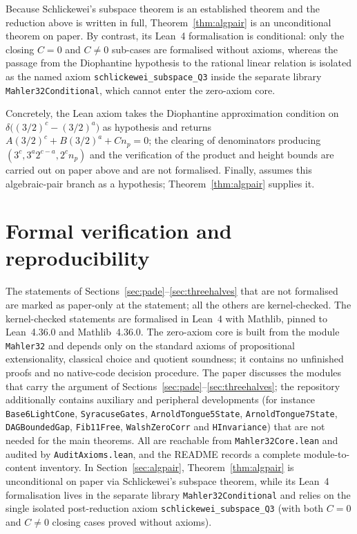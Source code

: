 \documentclass[11pt,a4paper]{article}
\theoremstyle{remark}
\begin{document}
Because Schlickewei's subspace theorem is an established theorem and the reduction above is written in full, Theorem~\ref{thm:algpair} is an unconditional theorem on paper. By contrast, its Lean~4 formalisation is conditional: only the closing $C = 0$ and $C \neq 0$ sub-cases are formalised without axioms, whereas the passage from the Diophantine hypothesis to the rational linear relation is isolated as the named axiom \texttt{schlickewei\_subspace\_Q3} inside the separate library \texttt{Mahler32Conditional}, which cannot enter the zero-axiom core.

Concretely, the Lean axiom takes the Diophantine approximation condition on $\delta\bigl((3/2)^{c}-(3/2)^{a}\bigr)$ as hypothesis and returns $A(3/2)^{c} + B(3/2)^{a} + C n_{p} = 0$; the clearing of denominators producing $(3^{c}, 3^{a}2^{c-a}, 2^{c}n_{p})$ and the verification of the product and height bounds are carried out on paper above and are not formalised. Finally, \citet[Theorem~5.15]{stephan2026minimal} assumes this algebraic-pair branch as a hypothesis; Theorem~\ref{thm:algpair} supplies it.

\section{Formal verification and reproducibility}
\label{sec:formal}

The statements of Sections~\ref{sec:pade}--\ref{sec:threehalves} that are not formalised are marked as paper-only at the statement; all the others are kernel-checked. The kernel-checked statements are formalised in Lean~4 with Mathlib, pinned to Lean~4.36.0 and Mathlib~4.36.0. The zero-axiom core is built from the module \texttt{Mahler32} and depends only on the standard axioms of propositional extensionality, classical choice and quotient soundness; it contains no unfinished proofs and no native-code decision procedure. The paper discusses the modules that carry the argument of Sections~\ref{sec:pade}--\ref{sec:threehalves}; the repository additionally contains auxiliary and peripheral developments (for instance \texttt{Base6LightCone}, \texttt{SyracuseGates}, \texttt{ArnoldTongue5State}, \texttt{ArnoldTongue7State}, \texttt{DAGBoundedGap}, \texttt{Fib11Free}, \texttt{WalshZeroCorr} and \texttt{HInvariance}) that are not needed for the main theorems. All are reachable from \texttt{Mahler32Core.lean} and audited by \texttt{AuditAxioms.lean}, and the README records a complete module-to-content inventory. In Section~\ref{sec:algpair}, Theorem~\ref{thm:algpair} is unconditional on paper via Schlickewei's subspace theorem, while its Lean~4 formalisation lives in the separate library \texttt{Mahler32Conditional} and relies on the single isolated post-reduction axiom \texttt{schlickewei\_subspace\_Q3} (with both $C=0$ and $C\neq 0$ closing cases proved without axioms).
\end{document}
